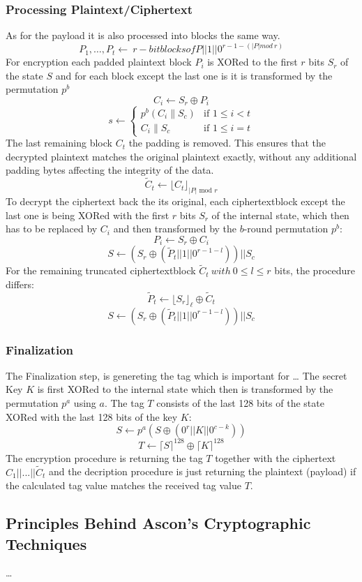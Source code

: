 \subsubsection{Processing Plaintext/Ciphertext}
As for the payload it is also processed into blocks the same way. 
$$P_1, \dots , P_t \leftarrow \ r-bit blocks of P || 1 || 0^{r-1-(|P| mod\ r)}$$
For encryption each padded plaintext block $P_i$ is XORed to the first $r$ bits $S_r$ of the state $S$ and for each block except the last one is it is transformed by the permutation $p^b$%
$$C_i \leftarrow S_r \oplus P_i$$
$$
s \leftarrow \begin{cases} 
    p^b(C_i \parallel S_c) & \text{if } 1 \leq i < t \\
    C_i \parallel S_c & \text{if } 1 \leq i = t
    \end{cases}
$$
The last remaining block $C_t$ the padding is removed. This ensures that the decrypted plaintext matches the original plaintext exactly, without any additional padding bytes affecting the integrity of the data.
$$\tilde{C}_t \leftarrow \lfloor C_t \rfloor_{|P| \text{ mod } r}$$
\newline
To decrypt the ciphertext back the its original, each ciphertextblock except the last one is being XORed with the first $r$ bits $S_r$ of the internal state, which then has to be replaced by $C_i$ and then transformed by the $b$-round permutation $p^b$:
$$ P_i\leftarrow S_r \oplus C_i $$
$$ S \leftarrow (S_r \oplus (\tilde P_t || 1 || 0^{r-1-l})) || S_c $$
For the remaining truncated ciphertextblock $\tilde C_t\ with\ 0 \leq l \le r$ bits, the procedure differs:
$$\tilde{P}_t \leftarrow \lfloor S_r \rfloor_\ell \oplus \tilde{C}_t$$
$$S \leftarrow (S_r \oplus (\tilde P_t || 1 || 0^{r-1-l})) || S_c$$
\cite{Ascon-v1.2}
\subsubsection{Finalization}
The Finalization step, is genereting the tag which is important for \dots
The secret Key $K$ is first XORed to the internal state which then is transformed by the permutation $p^a$ using $a$. The tag $T$ consists of the last 128 bits of the state XORed with the last 128 bits of the key $K$: %
$$S \leftarrow p^a(S \oplus (0^r || K || 0^{c-k}))$$
$$ T \leftarrow \lceil S  \rceil^{128} \oplus \lceil K \rceil^{128}$$
The encryption procedure is returning the tag $T$ together with the ciphertext $C_1||...||\tilde C_t$ and the decription procedure is just returning the plaintext (payload) if the calculated tag value matches the received tag value $T$. \cite{Ascon-v1.2}

\subsection{Principles Behind Ascon's Cryptographic Techniques}
\dots
